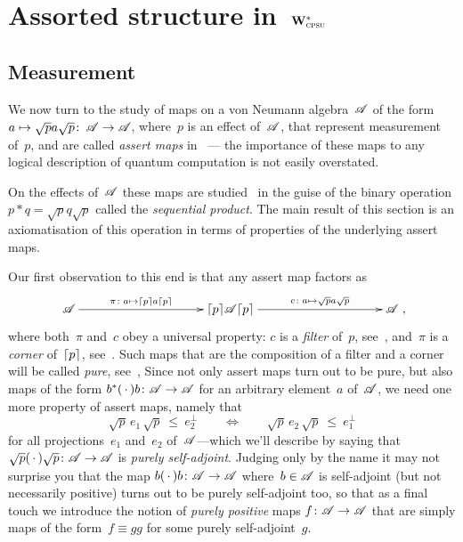 \documentclass[a]{subfiles}
\begin{document}
\chapter{Assorted structure in~$\mathbf{W}^*_{\text{\textsc{cpsu}}}$}

\section{Measurement}
\begin{parsec}
\begin{point}%
We now turn to the study of
maps on a von Neumann algebra~$\mathscr{A}$
of the form
$a\mapsto \sqrt{p}a\sqrt{p}\colon\,\mathscr{A}\to\mathscr{A}$,
where~$p$ is an effect of~$\mathscr{A}$,
that represent measurement of~$p$,
and are called \emph{assert maps} in~
--- the importance of these maps 
to any logical description of
quantum computation is not easily overstated.

On the effects of~$\mathscr{A}$
these maps are studied~ in the guise
of the binary operation
$p\ast q=\sqrt{p} q \sqrt{p}$
called the \emph{sequential product}.
The main result of this section
is an axiomatisation of this operation
in terms of properties
of the underlying assert maps.

Our first observation
to this end
is that any assert map factors as
\begin{equation*}
\xymatrix@C=10em{
\scrA
\ar[r]^-{\pi\colon a\mapsto \ceil{p}a\ceil{p}}
&
\ceil{p}\!\scrA\!\ceil{p}
\ar[r]^-{c\colon a\mapsto \sqrt{p}a\sqrt{p}}
&
\scrA
},
\end{equation*}
where both~$\pi$ and~$c$ obey a universal property:
$c$ is a \emph{filter} of~$p$, see~,
and~$\pi$ is a \emph{corner} of~$\left\lceil p\right\rceil$, see~.
Such maps
that are the composition of a filter and a corner
will be called \emph{pure}, see~,
Since not only assert maps turn out to be pure, but also maps of the form
$b^*(\,\cdot\,)b\colon \mathscr{A}\to\mathscr{A}$ for an arbitrary element~$a$
of~$\mathscr{A}$,
we need one more property of assert maps, namely
that
\begin{equation*}
	\sqrt{p}\,e_1\,\sqrt{p}\ \leq\  e_2^\perp 
	\qquad\iff\qquad
	\sqrt{p}\,e_2 \,\sqrt{p}\ \leq\  e_1^\perp
\end{equation*}
for all projections~$e_1$ and~$e_2$ of~$\mathscr{A}$---which we'll
describe by saying that $\sqrt{p}(\,\cdot\,)\sqrt{p}\colon \mathscr{A}\to\mathscr{A}$
is \emph{purely self-adjoint}.
Judging only by the name
it may not surprise you that the map $b(\,\cdot\,)b\colon \mathscr{A}\to\mathscr{A}$
where~$b\in \mathscr{A}$ is self-adjoint (but not necessarily positive)
turns out to be purely self-adjoint too,
so that as a final touch we introduce the notion
of \emph{purely positive} maps $f\colon \mathscr{A}\to\mathscr{A}$
that are simply maps of the form~$f\equiv gg$ for some purely self-adjoint~$g$.


\end{point}
\end{parsec}
\end{document}

